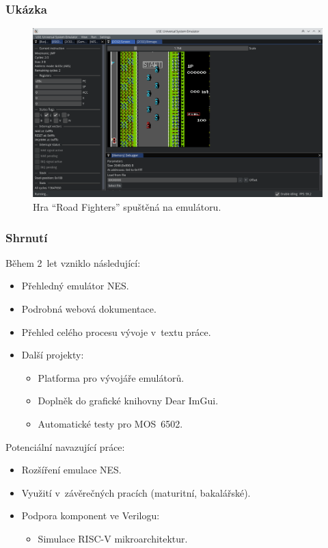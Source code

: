 \documentclass{beamer}
\begin{document}
\begin{frame}
	\frametitle{Ukázka}
	\begin{figure}
		\centering
		\includegraphics[width=1\textwidth]{images/ss_nes_game_loaded.png}
		\caption{\small Hra \enquote{Road Fighters} spuštěná na emulátoru.}
	\end{figure}
\end{frame}

\begin{frame}
	\frametitle{Shrnutí}
	Během 2~let vzniklo následující:
	\begin{itemize}
		\item Přehledný emulátor NES.
		\pause
		\item Podrobná webová dokumentace.
		\pause
		\item Přehled celého procesu vývoje v~textu práce.
		\pause
		\item Další projekty:
		\begin{itemize}
			\item Platforma pro vývojáře emulátorů.
			\item Doplněk do grafické knihovny Dear ImGui.
			\item Automatické testy pro MOS~6502.
		\end{itemize}
		\pause
	\end{itemize}
	Potenciální navazující práce:
	\begin{itemize}
		\item Rozšíření emulace NES.
		\pause
		\item Využití v~závěrečných pracích (maturitní, bakalářské).
		\pause
		\item Podpora komponent ve Verilogu:
		\begin{itemize}
			\item Simulace RISC-V mikroarchitektur.
		\end{itemize}
	\end{itemize}
\end{frame}
\end{document}

